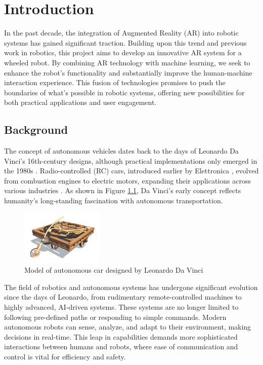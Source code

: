 \chapter{\label{ch:intro} Introduction}

In the past decade, the integration of Augmented Reality (AR) into robotic systems has gained significant traction. Building upon this trend and previous work in robotics, this project aims to develop an innovative AR system for a wheeled robot. By combining AR technology with machine learning, we seek to enhance the robot's functionality and substantially improve the human-machine interaction experience. This fusion of technologies promises to push the boundaries of what's possible in robotic systems, offering new possibilities for both practical applications and user engagement.

\section{\label{sec:backg}Background}
The concept of autonomous vehicles dates back to the days of Leonardo Da Vinci's 16th-century designs, although practical implementations only emerged in the 1980s \cite{Mobileye2023}. Radio-controlled (RC) cars, introduced earlier by Elettronica \cite{RC_Crush2023}, evolved from combustion engines to electric motors, expanding their applications across various industries \cite{GoogleBooks2017}. As shown in Figure \ref{fig:davinci_car}, Da Vinci's early concept reflects humanity's long-standing fascination with autonomous transportation.

\begin{figure}[h]
\centering
\includegraphics[width=0.35\textwidth]{ch1/figs/Vinci_car.jpg}
\caption{Model of autonomous car designed by Leonardo Da Vinci}
\label{fig:davinci_car}
\end{figure}

The field of robotics and autonomous systems has undergone significant evolution since the days of Leonardo, from rudimentary remote-controlled machines to highly advanced, AI-driven systems. These systems are no longer limited to following pre-defined paths or responding to simple commands. Modern autonomous robots can sense, analyze, and adapt to their environment, making decisions in real-time\cite{Samuels2023}. This leap in capabilities demands more sophisticated interactions between humans and robots, where ease of communication and control is vital for efficiency and safety. 

